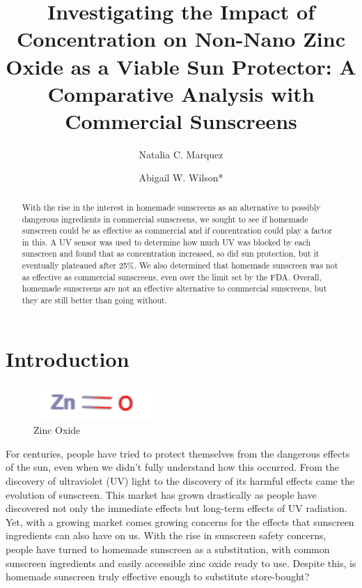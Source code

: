\documentclass{article}
\title{Investigating the Impact of Concentration on Non-Nano Zinc Oxide as a Viable Sun Protector: A Comparative Analysis with Commercial Sunscreens}
\author[1$\dag$]{Natalia C. Marquez}
\author[2$\dag$]{Abigail W. Wilson*}
\affil[1]{The Institute for Computing in Research, Santa Fe, New Mexico, The United States.}
\affil[*]{Address correspondence to: ncmarquez51@gmail.com}
\affil[$\dag$]{}
\date{}
\begin{document}
\maketitle

\begin{abstract}
With the rise in the interest in homemade sunscreens as an alternative to possibly dangerous ingredients in commercial sunscreens, we sought to see if homemade sunscreen could be as effective as commercial and if concentration could play a factor in this. A UV sensor was used to determine how much UV was blocked by each sunscreen and found that as concentration increased, so did sun protection, but it eventually plateaued after 25\%. We also determined that homemade sunscreen was not as effective as commercial sunscreens, even over the limit set by the FDA. Overall, homemade sunscreens are not an effective alternative to commercial sunscreens, but they are still better than going without.

\end{abstract}


\section{Introduction}
\begin{figure}
  \centering
  \caption{Zinc Oxide}
  \includegraphics[width=0.4\textwidth]{ZnO_Structure.png}
\end{figure}
For centuries, people have tried to protect themselves from the dangerous effects of the sun, even when we didn’t fully understand how this occurred. From the discovery of ultraviolet (UV) light to the discovery of its harmful effects came the evolution of sunscreen. This market has grown drastically as people have discovered not only the immediate effects but long-term effects of UV radiation. Yet, with a growing market comes growing concerns for the effects that sunscreen ingredients can also have on us. With the rise in sunscreen safety concerns, people have turned to homemade sunscreen as a substitution, with common sunscreen ingredients and easily accessible zinc oxide ready to use. Despite this, is homemade sunscreen truly effective enough to substitute store-bought?
\end{document}
